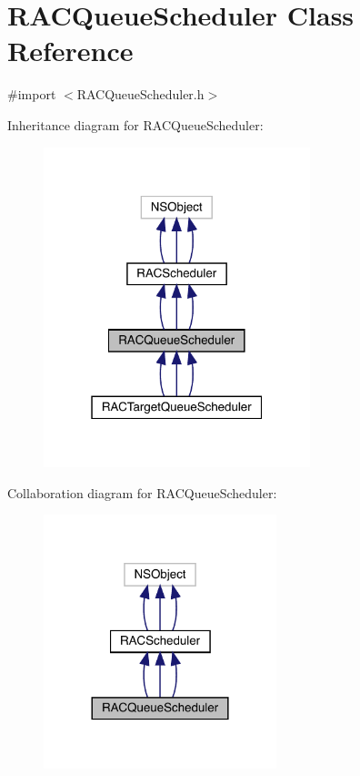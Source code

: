 \hypertarget{interface_r_a_c_queue_scheduler}{}\section{R\+A\+C\+Queue\+Scheduler Class Reference}
\label{interface_r_a_c_queue_scheduler}


{\ttfamily \#import $<$R\+A\+C\+Queue\+Scheduler.\+h$>$}



Inheritance diagram for R\+A\+C\+Queue\+Scheduler\+:\nopagebreak
\begin{figure}[H]
\begin{center}
\leavevmode
\includegraphics[width=220pt]{interface_r_a_c_queue_scheduler__inherit__graph}
\end{center}
\end{figure}


Collaboration diagram for R\+A\+C\+Queue\+Scheduler\+:\nopagebreak
\begin{figure}[H]
\begin{center}
\leavevmode
\includegraphics[width=192pt]{interface_r_a_c_queue_scheduler__coll__graph}
\end{center}
\end{figure}
